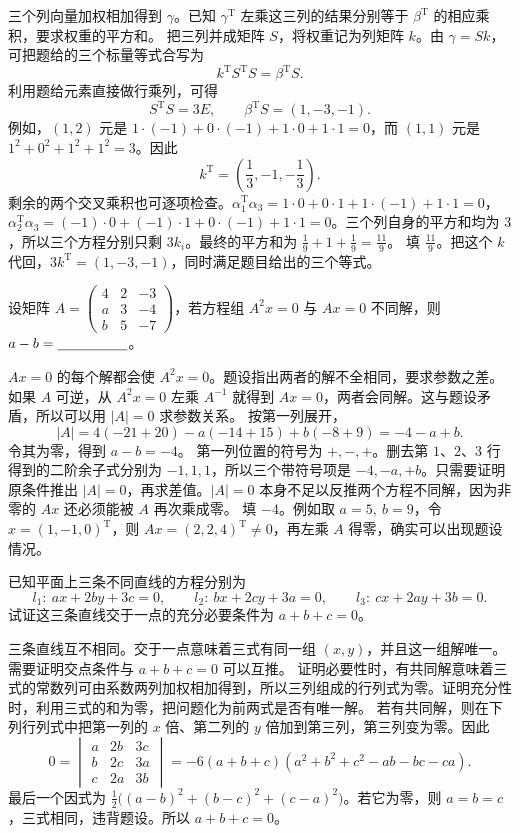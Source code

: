 \documentclass[UTF8,zihao=-4,fontset=fandol]{ctexart}
\begin{document}
\Solution
\Known 三个列向量加权相加得到 $\gamma$。已知 $\gamma^{\mathrm T}$ 左乘这三列的结果分别等于 $\beta^{\mathrm T}$ 的相应乘积，要求权重的平方和。
\Method 把三列并成矩阵 $S$，将权重记为列矩阵 $k$。由 $\gamma=Sk$，可把题给的三个标量等式合写为
\[
k^{\mathrm T}S^{\mathrm T}S=\beta^{\mathrm T}S.
\]
\Derive 利用题给元素直接做行乘列，可得
\[
S^{\mathrm T}S=3E,\qquad \beta^{\mathrm T}S=(1,-3,-1).
\]
例如，$(1,2)$ 元是 $1\cdot(-1)+0\cdot(-1)+1\cdot0+1\cdot1=0$，而 $(1,1)$ 元是 $1^2+0^2+1^2+1^2=3$。因此
\[
k^{\mathrm T}=\left(\frac{1}{3},-1,-\frac{1}{3}\right).
\]
剩余的两个交叉乘积也可逐项检查。$\alpha_1^{\mathrm T}\alpha_3=1\cdot0+0\cdot1+1\cdot(-1)+1\cdot1=0$，$\alpha_2^{\mathrm T}\alpha_3=(-1)\cdot0+(-1)\cdot1+0\cdot(-1)+1\cdot1=0$。三个列自身的平方和均为 $3$，所以三个方程分别只剩 $3k_i$。最终的平方和为 $\frac{1}{9}+1+\frac{1}{9}=\frac{11}{9}$。
\Verify 填 $\boxed{\frac{11}{9}}$。把这个 $k$ 代回，$3k^{\mathrm T}=(1,-3,-1)$，同时满足题目给出的三个等式。

设矩阵 $A=\begin{pmatrix}4&2&-3\\a&3&-4\\b&5&-7\end{pmatrix}$，若方程组 $A^2x=0$ 与 $Ax=0$ 不同解，则 $a-b=\underline{\hspace{5em}}$。

\Solution
\Known $Ax=0$ 的每个解都会使 $A^2x=0$。题设指出两者的解不全相同，要求参数之差。
\Method 如果 $A$ 可逆，从 $A^2x=0$ 左乘 $A^{-1}$ 就得到 $Ax=0$，两者会同解。这与题设矛盾，所以可以用 $|A|=0$ 求参数关系。
\Derive 按第一列展开，
\[
|A|=4(-21+20)-a(-14+15)+b(-8+9)=-4-a+b.
\]
令其为零，得到 $a-b=-4$。
第一列位置的符号为 $+,-,+$。删去第 $1$、$2$、$3$ 行得到的二阶余子式分别为 $-1,1,1$，所以三个带符号项是 $-4,-a,+b$。只需要证明原条件推出 $|A|=0$，再求差值。$|A|=0$ 本身不足以反推两个方程不同解，因为非零的 $Ax$ 还必须能被 $A$ 再次乘成零。
\Verify 填 $\boxed{-4}$。例如取 $a=5,\ b=9$，令 $x=(1,-1,0)^{\mathrm T}$，则 $Ax=(2,2,4)^{\mathrm T}\ne0$，再左乘 $A$ 得零，确实可以出现题设情况。

已知平面上三条不同直线的方程分别为
\[
l_1:\ ax+2by+3c=0,\qquad
l_2:\ bx+2cy+3a=0,\qquad
l_3:\ cx+2ay+3b=0.
\]
试证这三条直线交于一点的充分必要条件为 $a+b+c=0$。

\Solution
\Known 三条直线互不相同。交于一点意味着三式有同一组 $(x,y)$，并且这一组解唯一。需要证明交点条件与 $a+b+c=0$ 可以互推。
\Method 证明必要性时，有共同解意味着三式的常数列可由系数两列加权相加得到，所以三列组成的行列式为零。证明充分性时，利用三式的和为零，把问题化为前两式是否有唯一解。
\Derive 若有共同解，则在下列行列式中把第一列的 $x$ 倍、第二列的 $y$ 倍加到第三列，第三列变为零。因此
\[
0=\begin{vmatrix}a&2b&3c\\b&2c&3a\\c&2a&3b\end{vmatrix}
=-6(a+b+c)(a^2+b^2+c^2-ab-bc-ca).
\]
最后一个因式为 $\frac{1}{2}\big((a-b)^2+(b-c)^2+(c-a)^2\big)$。若它为零，则 $a=b=c$，三式相同，违背题设。所以 $a+b+c=0$。
\end{document}
